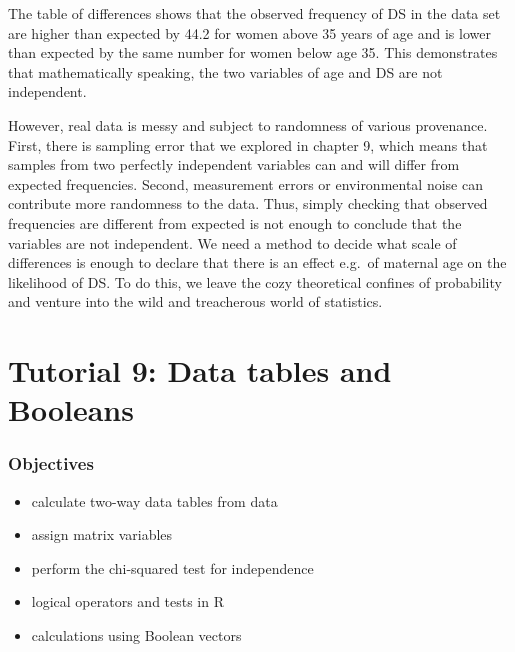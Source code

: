\documentclass[
  letterpaper,
  DIV=11,
  numbers=noendperiod]{scrreprt}
\providecommand{\tightlist}{%
  \setlength{\itemsep}{0pt}\setlength{\parskip}{0pt}}\usepackage{longtable,booktabs,array}
\begin{document}
The table of differences shows that the observed frequency of DS in the
data set are higher than expected by 44.2 for women above 35 years of
age and is lower than expected by the same number for women below age
35. This demonstrates that mathematically speaking, the two variables of
age and DS are not independent.

However, real data is messy and subject to randomness of various
provenance. First, there is sampling error that we explored in chapter
9, which means that samples from two perfectly independent variables can
and will differ from expected frequencies. Second, measurement errors or
environmental noise can contribute more randomness to the data. Thus,
simply checking that observed frequencies are different from expected is
not enough to conclude that the variables are not independent. We need a
method to decide what scale of differences is enough to declare that
there is an effect e.g.~of maternal age on the likelihood of DS. To do
this, we leave the cozy theoretical confines of probability and venture
into the wild and treacherous world of statistics.


\hypertarget{tutorial-9-data-tables-and-booleans}{%
\chapter*{Tutorial 9: Data tables and
Booleans}\label{tutorial-9-data-tables-and-booleans}}


\hypertarget{objectives-3}{%
\subsection*{Objectives}\label{objectives-3}}

\begin{itemize}
\tightlist
\item
  calculate two-way data tables from data
\item
  assign matrix variables
\item
  perform the chi-squared test for independence
\item
  logical operators and tests in R
\item
  calculations using Boolean vectors
\end{itemize}
\end{document}
